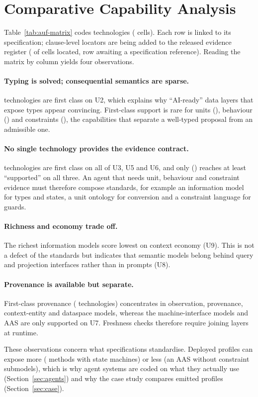 \section{Comparative Capability Analysis}
\label{sec:capabilities}



Table~\ref{tab:auf-matrix} codes \AufTechnologies{} technologies (\AufCells{} cells).
Each row is linked to its specification; clause-level locators are being added to the
released evidence register (\AufLocated{} of \AufCells{} cells located,
\AufUncited{} row awaiting a specification reference). Reading the matrix by column
yields four observations.

\paragraph{Typing is solved; consequential semantics are sparse.} \AufTypesFirstClass{}
technologies are first class on U2, which explains why ``AI-ready'' data layers that expose
types appear convincing. First-class support is rare for units (\AufUnitsFirstClass{}),
behaviour (\AufBehaviourFirstClass{}) and constraints (\AufConstraintsFirstClass{}), the
capabilities that separate a well-typed proposal from an admissible one.

\paragraph{No single technology provides the evidence contract.} \AufAllThreeFirstClass{}
technologies are first class on all of U3, U5 and U6, and only \AufAllThreeStrong{}
(\AufAllThreeStrongNames{}) reaches at least ``supported'' on all three. An agent that
needs unit, behaviour and constraint evidence must therefore compose standards, for
example an information model for types and states, a unit ontology for conversion and a
constraint language for guards.

\paragraph{Richness and economy trade off.} The richest information models score lowest on
context economy (U9). This is not a defect of the standards but indicates that semantic
models belong behind query and projection interfaces rather than in prompts (U8).

\paragraph{Provenance is available but separate.} First-class provenance
(\AufProvenanceFirstClass{} technologies) concentrates in observation, provenance,
context-entity and dataspace models, whereas the machine-interface models \opcua{} and AAS
are only supported on U7. Freshness checks therefore require joining layers at runtime.

These observations concern what specifications standardise. Deployed profiles can expose
more (\opcua{} methods with state machines) or less (an AAS without constraint submodels),
which is why agent systems are coded on what they actually use
(Section~\ref{sec:agents}) and why the case study compares emitted profiles
(Section~\ref{sec:case}).
